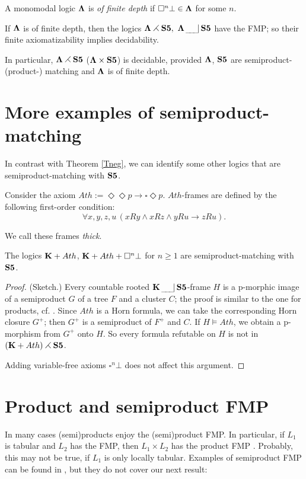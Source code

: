 \documentclass[twoside]{aiml20}
\def\Di{\Diamond}
\def\fo{\forall}
\def\ri{\rightarrow}
\def\BK{{\bf K}}
\def\sqr{\square}
\def\bLa{{\bf \Lambda}}
\def\we{\wedge}
\def\sem0{\,_{\_\!\_\!\_}\!|\,}
\def\sem{\,_{\_\!\_\!\_}\!|\,\bS5}
\def\rtt{\rightthreetimes}
\def\bLa{{\bf \Lambda}}
\def\bS5{{\bf S5}}
\def\Di{\Diamond}
\def\fo{\forall}
\def\mo{\vDash}
\def\ri{\rightarrow}
\def\sqr{\square}
\def\ti{\times}
\def\we{\wedge}
\begin{document}
{%

A monomodal logic $\bLa$ is {\em of finite depth} if $\sqr^n\bot\in\bLa$ for some $n$.

\begin{corollary}
If $\bLa$ is of finite depth, then the logics 
$\bLa\rtt\bS5, ~\bLa\sem$ have the FMP; so their finite axiomatizability implies decidability.
\end{corollary}

In particular, $\bLa\rtt\bS5$ ($\bLa\ti\bS5$) is decidable, provided
$\bLa$, $\bS5$ are semiproduct- (product-) matching and $\bLa$ is of finite depth.

\section{More examples of semiproduct-matching}
In contrast with Theorem \ref{Tneg}, we can identify some other
logics that are semiproduct-matching with $\bS5$.

\begin{lemma}
Consider the axiom $Ath:=\Di\Di p\ri \sqr\Di p$. $Ath$-frames are defined by the following first-order condition:
$$\fo x,y,z,u\, (xRy \we xRz \we yRu \ri zRu).$$
\end{lemma}
We call these frames {\em thick}.

\begin{proposition}\label{SPM}
The logics $\BK+Ath$, $\BK+Ath+\sqr^n\bot$ for $n\geq 1$ are semiproduct-matching with $\bS5$.
\end{proposition}

\begin{proof} (Sketch.)  Every countable rooted $\BK\sem$-frame $H$ is
  a p-morphic image of a semiproduct $G$ of a tree $F$ and a cluster
  $C$; the proof is similar to the one for products,
  cf. \cite{GKWZ}. Since $Ath$ is a Horn formula, we can take the
  corresponding Horn closure $G^+$; then $G^+$ is a semiproduct of
  $F^+$ and $C$. If $H\mo Ath$, we obtain a p-morphism from $G^+$ onto
  $H$. So every formula refutable on $H$ is not in
  $(\BK+Ath)\rtt\bS5$.

Adding variable-free axioms   $\sqr^n\bot$ does not affect this argument.
\end{proof}

\section{Product and semiproduct FMP}
In many cases (semi)products enjoy the (semi)product FMP.  In
particular, if $L_1$ is tabular and $L_2$ has the FMP, then
$L_1\ti L_2$ has the product FMP \cite[Cor. 5.9]{p37}. 
Probably, this may not be true, if $L_1$ is only locally tabular.  Examples of
semiproduct FMP can be found in \cite{NPR}, but they do not cover our
next result:

}
\end{document}
